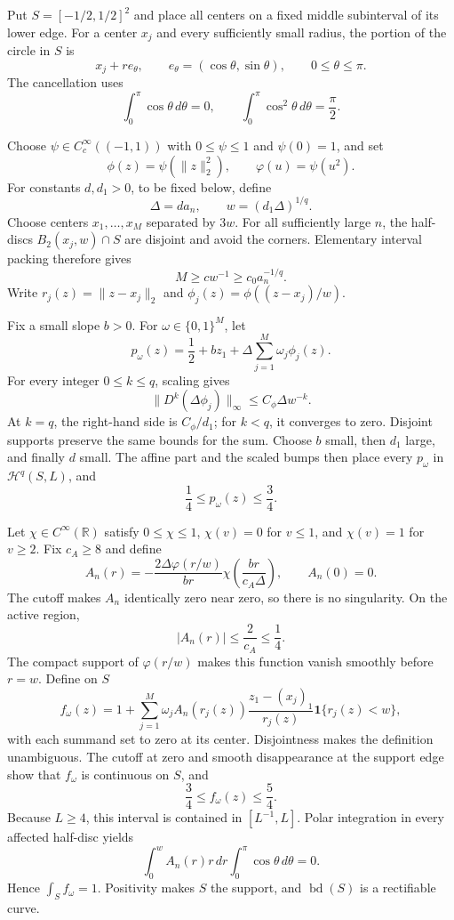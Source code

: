 Put \(S=[-1/2,1/2]^2\) and place all centers on a fixed middle subinterval of its lower edge.  For a center \(x_j\) and every sufficiently small radius, the portion of the circle in \(S\) is
\[
 x_j+r e_\theta,
 \qquad e_\theta=(\cos\theta,\sin\theta),
 \qquad 0\leq\theta\leq\pi.
\]
The cancellation uses
\[
 \int_0^\pi\cos\theta\,d\theta=0,
 \qquad
 \int_0^\pi\cos^2\theta\,d\theta=\frac\pi2.
\]

Choose \(\psi\in C_c^\infty((-1,1))\) with \(0\leq\psi\leq1\) and \(\psi(0)=1\), and set
\[
 \phi(z)=\psi(\lVert z\rVert_2^2),
 \qquad
 \varphi(u)=\psi(u^2).
\]
For constants \(d,d_1>0\), to be fixed below, define
\[
 \Delta=d a_n,
 \qquad
 w=(d_1\Delta)^{1/q}.
\]
Choose centers \(x_1,\ldots,x_M\) separated by \(3w\).  For all sufficiently large \(n\), the half-discs \(B_2(x_j,w)\cap S\) are disjoint and avoid the corners.  Elementary interval packing therefore gives
\[
 M\geq c w^{-1}\geq c_0a_n^{-1/q}.
\]
Write \(r_j(z)=\lVert z-x_j\rVert_2\) and \(\phi_j(z)=\phi((z-x_j)/w)\).

Fix a small slope \(b>0\).  For \(\omega\in\{0,1\}^M\), let
\[
 p_\omega(z)=\frac12+bz_1+\Delta\sum_{j=1}^M\omega_j\phi_j(z).
\]
For every integer \(0\leq k\leq q\), scaling gives
\[
 \lVert D^k(\Delta\phi_j)\rVert_\infty
 \leq C_\phi\Delta w^{-k}.
\]
At \(k=q\), the right-hand side is \(C_\phi/d_1\); for \(k<q\), it converges to zero.  Disjoint supports preserve the same bounds for the sum.  Choose \(b\) small, then \(d_1\) large, and finally \(d\) small.  The affine part and the scaled bumps then place every \(p_\omega\) in \(\mathcal H^q(S,L)\), and
\[
 \frac14\leq p_\omega(z)\leq\frac34.
\]

Let \(\chi\in C^\infty(\mathbb R)\) satisfy \(0\leq\chi\leq1\), \(\chi(v)=0\) for \(v\leq1\), and \(\chi(v)=1\) for \(v\geq2\).  Fix \(c_A\geq8\) and define
\[
 A_n(r)=-\frac{2\Delta\varphi(r/w)}{br}
 \chi\!\left(\frac{br}{c_A\Delta}\right),
 \qquad A_n(0)=0.
\]
The cutoff makes \(A_n\) identically zero near zero, so there is no singularity.  On the active region,
\[
 |A_n(r)|\leq\frac2{c_A}\leq\frac14.
\]
The compact support of \(\varphi(r/w)\) makes this function vanish smoothly before \(r=w\).  Define on \(S\)
\[
 f_\omega(z)=1+\sum_{j=1}^M\omega_j A_n(r_j(z))
 \frac{z_1-(x_j)_1}{r_j(z)}\mathbf1\{r_j(z)<w\},
\]
with each summand set to zero at its center.  Disjointness makes the definition unambiguous.  The cutoff at zero and smooth disappearance at the support edge show that \(f_\omega\) is continuous on \(S\), and
\[
 \frac34\leq f_\omega(z)\leq\frac54.
\]
Because \(L\geq4\), this interval is contained in \([L^{-1},L]\).  Polar integration in every affected half-disc yields
\[
 \int_0^w A_n(r)r\,dr\int_0^\pi\cos\theta\,d\theta=0.
\]
Hence \(\int_Sf_\omega=1\).  Positivity makes \(S\) the support, and \(\operatorname{bd}(S)\) is a rectifiable curve.

